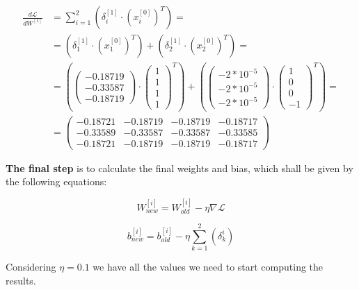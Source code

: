 \documentclass[12pt]{article}
\begin{document}
\begin{enumerate}[leftmargin=\labelsep]
          \begin{align*}
            \frac{d\mathcal{L}}{dW^{[1]}} &= \sum_{i=1}^{2} (\delta^{[1]}_i \cdot (x^{[0]}_i)^{T}) = \\
             &= (\delta^{[1]}_1 \cdot (x^{[0]}_1)^{T}) + (\delta^{[1]}_2 \cdot (x^{[0]}_2)^{T}) = \\
             &= (\begin{pmatrix} -0.18719 \\ -0.33587 \\ -0.18719 \end{pmatrix} \cdot \begin{pmatrix} 1 \\ 1 \\ 1 \\ 1\end{pmatrix}^{T}) + 
                 (\begin{pmatrix} -2 * 10^{-5} \\ -2 * 10^{-5} \\ -2 * 10^{-5}  \end{pmatrix} \cdot \begin{pmatrix} 1 \\ 0 \\ 0 \\ -1\end{pmatrix}^{T}) = \\
             &= \begin{pmatrix} -0.18721 & -0.18719 & -0.18719 & -0.18717\\ -0.33589 & -0.33587 & -0.33587 & -0.33585 \\ -0.18721 & -0.18719 & -0.18719 & -0.18717\end{pmatrix}
          \end{align*}

          \textbf{The final step} is to calculate the final weights and bias, which shall be given by the following equations:
          
          \begin{equation}\label{ex2-new-weight}
            W^{[i]}_{new} = W^{[i]}_{old} - \eta \nabla\mathcal{L}
          \end{equation}

          \begin{equation}\label{ex2-new-bias}
            b^{[i]}_{new} = b^{[i]}_{old} - \eta \sum_{k=1}^{2}(\delta_k^{i}) 
          \end{equation}

          Considering $\eta = 0.1$ we have all the values we need to start computing the results.
          

\end{enumerate}
\end{document}

